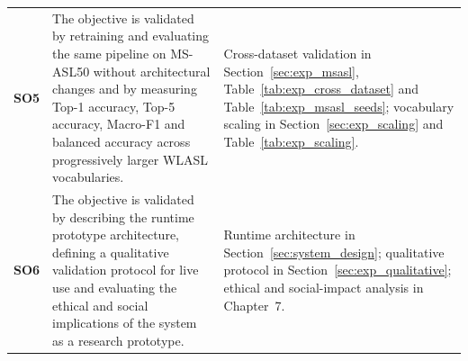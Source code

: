 \begin{table}[!htbp]
\begin{tabular}{@{}p{1.3cm} p{5.8cm} p{5.6cm}@{}}
        \addlinespace
        \textbf{SO5}                                                                                                                                                                                                                                                                               &
        The objective is validated by retraining and evaluating the same pipeline on MS-ASL50 without architectural changes and by measuring Top-1 accuracy, Top-5 accuracy, Macro-F1 and balanced accuracy across progressively larger WLASL vocabularies.                                        &
        Cross-dataset validation in Section~\ref{sec:exp_msasl}, Table~\ref{tab:exp_cross_dataset} and Table~\ref{tab:exp_msasl_seeds}; vocabulary scaling in Section~\ref{sec:exp_scaling} and Table~\ref{tab:exp_scaling}.                                                                                                                                                    \\
        \addlinespace
        \textbf{SO6}                                                                                                                                                                                                                                                                               &
        The objective is validated by describing the runtime prototype architecture, defining a qualitative validation protocol for live use and evaluating the ethical and social implications of the system as a research prototype.                                                             &
        Runtime architecture in Section~\ref{sec:system_design}; qualitative protocol in Section~\ref{sec:exp_qualitative}; ethical and social-impact analysis in Chapter~7.                                                                                                                                                                                                    \\
        \bottomrule
    \end{tabular}
\end{table}
